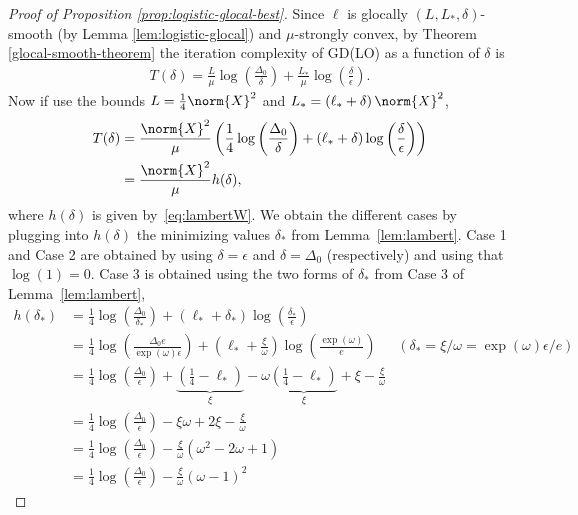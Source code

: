 \documentclass[10pt]{article} %
\begin{document}
\begin{proof}[Proof of Proposition \ref{prop:logistic-glocal-best}]
Since $\ell$ is glocally $(L, L_*, \delta)$-smooth (by Lemma \ref{lem:logistic-glocal}) and $\mu$-strongly convex, by Theorem \ref{glocal-smooth-theorem} the iteration complexity of GD(LO) as a function of $\delta$ is
\begin{align*}
    T(\delta) =
    \frac{L}{\mu}\log\left(\frac{\Delta_{0}}{\delta}\right) + \frac{L_*}{\mu}\log\left(\frac{\delta}{\epsilon}\right).
\end{align*}
\newline
Now if use the bounds $L = \frac{1}{4}\norm{X}^2$ and $L_{*} = (\ell_{*} + \delta)\, \norm{X}^2$, 
\begin{align}
    \label{logistic-complexity}
    T(\delta) & =
    \frac{\norm{X}^2}{\mu}\left(\frac{1}{4}\log\left(\frac{\Delta_{0}}{\delta}\right) + (\ell_{*} + \delta)\log\left(\frac{\delta}{\epsilon}\right)\right)\\
    & = \frac{\norm{X}^2}{\mu}h(\delta),
\end{align}
where $h(\delta)$ is given by~\eqref{eq:lambertW}. 
We obtain the different cases by plugging into $h(\delta)$ the minimizing values $\delta_*$ from Lemma~\ref{lem:lambert}.
Case 1 and Case 2 are obtained by using $\delta=\epsilon$ and $\delta = \Delta_0$ (respectively) and using that $\log(1)=0$. Case 3 is obtained using the two forms of $\delta_*$ from Case 3 of Lemma~\ref{lem:lambert},
\begin{align*}
h(\delta_*) & = \frac{1}{4}\log\left(\frac{\Delta_{0}}{\delta_*}\right) + (\ell_{*} + \delta_*)\log\left(\frac{\delta_*}{\epsilon}\right)\\
& = \frac{1}{4}\log\left(\frac{\Delta_{0}e}{\exp(\omega)\epsilon}\right) + \left(\ell_{*} + \frac \xi \omega\right)\log\left(\frac{\exp(\omega)}{e}\right) & (\delta_* = \xi/\omega =\exp(\omega)\epsilon/e)\\
& = \frac 1 4\log\left(\frac{\Delta_0}{\epsilon}\right) + \underbrace{\left(\frac 1 4 - \ell_*\right)}_\xi - \omega\underbrace{\left(\frac 1 4 - \ell_*\right)}_\xi + \xi - \frac \xi \omega\\
& = \frac 1 4\log\left(\frac{\Delta_0}{\epsilon}\right) - \xi\omega + 2\xi - \frac \xi \omega\\
& = \frac 1 4\log\left(\frac{\Delta_0}{\epsilon}\right) - \frac \xi \omega (\omega^2  -2\omega + 1)\\
& = \frac 1 4\log\left(\frac{\Delta_0}{\epsilon}\right) - \frac \xi \omega (\omega- 1)^2
\end{align*}
\end{proof}
\end{document}
